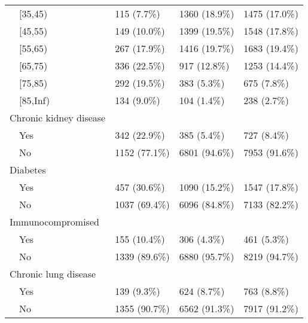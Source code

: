\begin{table}[ht]
\begin{tabular}{llll}
    [35,45) & 115 (7.7\%) & 1360 (18.9\%) & 1475 (17.0\%) \\ 
    [45,55) & 149 (10.0\%) & 1399 (19.5\%) & 1548 (17.8\%) \\ 
    [55,65) & 267 (17.9\%) & 1416 (19.7\%) & 1683 (19.4\%) \\ 
    [65,75) & 336 (22.5\%) & 917 (12.8\%) & 1253 (14.4\%) \\ 
    [75,85) & 292 (19.5\%) & 383 (5.3\%) & 675 (7.8\%) \\ 
    [85,Inf) & 134 (9.0\%) & 104 (1.4\%) & 238 (2.7\%) \\ 
  Chronic kidney disease &  &  &  \\ 
    Yes & 342 (22.9\%) & 385 (5.4\%) & 727 (8.4\%) \\ 
    No & 1152 (77.1\%) & 6801 (94.6\%) & 7953 (91.6\%) \\ 
  Diabetes &  &  &  \\ 
    Yes & 457 (30.6\%) & 1090 (15.2\%) & 1547 (17.8\%) \\ 
    No & 1037 (69.4\%) & 6096 (84.8\%) & 7133 (82.2\%) \\ 
  Immunocompromised &  &  &  \\ 
    Yes & 155 (10.4\%) & 306 (4.3\%) & 461 (5.3\%) \\ 
    No & 1339 (89.6\%) & 6880 (95.7\%) & 8219 (94.7\%) \\ 
  Chronic lung disease &  &  &  \\ 
    Yes & 139 (9.3\%) & 624 (8.7\%) & 763 (8.8\%) \\ 
    No & 1355 (90.7\%) & 6562 (91.3\%) & 7917 (91.2\%) \\ 
   \hline
\end{tabular}
\end{table}
